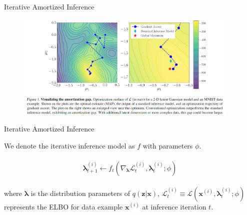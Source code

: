 \documentclass{beamer}		%
\begin{document}
\begin{frame}{Iterative Amortized Inference}

\begin{figure}[t]
\includegraphics[width=0.95\textwidth]{figure11.png}
\label{fig1}
\end{figure}

\end{frame}



\begin{frame}{Iterative Amortized Inference}

We denote the iterative inference model as $f$ with parameters $\phi$.

\begin{eqnarray*}
\begin{aligned}
\bm{\lambda}_{t+1}^{(i)} \gets f_t(\nabla_{\bm{\lambda}} \mathcal{L}_t^{(i)}, \bm{\lambda}_t^{(i)}; \phi)
\end{aligned}    
\end{eqnarray*}

where $\bm{\lambda}$ is the distribution parameters of $q(\bm{z}|\bm{x})$, $\mathcal{L}_t^{(i)} \equiv \mathcal{L}(\bm{x}^{(i)}, \bm{\lambda}_t^{(i)}; \phi)$ represents the ELBO for data example $\bm{x}^{(i)}$ at inference iteration $t$.

\end{frame}
\end{document}
